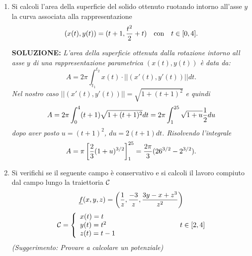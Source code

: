\documentclass[12pt,a4paper]{report}\pagenumbering{roman}
\begin{document}
\begin{enumerate}
 {\sl Utilizzando la trasformazione in coordinate
sferiche
$$\left\{\begin{array}{l} x=\rho\cos\theta\sin\omega\\
                          y=\rho\sin\theta\sin\omega\\
                          z=\rho\cos\omega
         \end{array} 
  \right.\ \ |\det(J(x,y,z))|=\rho^2\sin\omega,$$
osservando che si sta integrando su una sfera unitaria e che
$$x^2+y^2+(z-2)^2=\rho^2-4\rho\cos\omega+4,$$
otteniamo 
$$\int\!\!\int\!\!\int_{\Omega} {1\over \sqrt{x^2+y^2+(z-2)^2}}=
\int_0^{2\pi}d\theta\ \int_0^1d\rho\ \int_0^\pi d\omega
{\rho^2\sin\omega\over \sqrt{\rho^2-4\rho\cos\omega+4}}.$$
Mentre la variabile $\theta$ \`e gi\`a separata, \`e opportuno
integrare prima rispetto a $\omega$ e poi rispetto a $\rho$:
$$\int\!\!\int\!\!\int_{\Omega} {1\over \sqrt{x^2+y^2+(z-2)^2}}=
2\pi\int_0^1\rho^2d\rho\ \int_0^\pi 
{-d\cos\omega\over \sqrt{\rho^2-4\rho\cos\omega+4}}=$$
$$2\pi\int_0^1\rho^2d\rho
\left[{1\over 2\rho}\sqrt{\rho^2-4\rho\cos\omega+4}\right]_0^{\pi}=$$
$$\pi\int_0^1\rho\left[\sqrt{\rho^2+4\rho+4}-\sqrt{\rho^2-4\rho+4}
\right]d\rho=$$
$$=\pi\int_0^1\rho\left[\sqrt{(\rho+2)^2}-\sqrt{(\rho-2)^2}\right]d\rho
=4\pi\int_0^1\rho d\rho=2\pi.$$}

\item Si calcoli l'area della superficie del solido ottenuto ruotando
intorno all'asse $y$ la curva associata alla rappresentazione 
$$(x(t),y(t))=(t+1,{t^2\over2}+t)\ \ \ \mbox{con}\ \ \ t\in[0,4].$$
\bigskip 

{\bf SOLUZIONE:} {\sl L'area della superficie ottenuta dalla rotazione
intorno all asse $y$
di una rappresentazione parametrica $(x(t),y(t))$ \`e data da:
$$A=2\pi\int_{t_1}^{t_2}x(t)\cdot||(x'(t),y'(t))||dt.$$
Nel nostro caso $||(x'(t),y'(t))||=\sqrt{1+(t+1)^2}$ e quindi
$$A=2\pi\int_0^4(t+1)\sqrt{1+(t+1)^2}dt=2\pi\int_1^{25}\sqrt{1+u}{1\over2}du$$
dopo aver posto $u=(t+1)^2$, $du=2(t+1)dt$. Risolvendo l'integrale
$$A=\pi\left[{2\over3}(1+u)^{3/2}\right]_1^{25}={2\pi\over3}
(26^{3/2}-2^{3/2}).$$}


\item Si verifichi se il seguente campo \`e conservativo e si calcoli
il lavoro compiuto dal campo lungo la traiettoria ${\cal C}$
$$\underline{f}(x,y,z)=\left({1\over z},{-3\over z},{3y-x+z^3\over z^2}\right)$$
$${\cal C}=\left\{\begin{array}{ll}
x(t)=t\\ y(t)=t^2 \\ z(t)=t-1
\end{array}\right.\hspace{3cm}t\in[2,4]$$
{\it (Suggerimento: Provare a calcolare un potenziale)}
\bigskip 


\end{enumerate}
\end{document}

